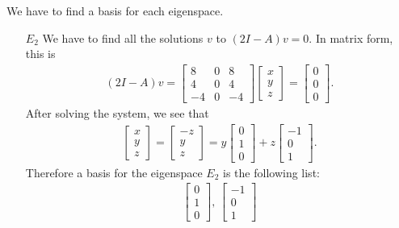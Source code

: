 \documentclass[12pt]{article}
\begin{document}
	\vspace*{16pt}
	
	We have to find a basis for each eigenspace.
	\begin{enumerate}
	\item[\underline{$E_{2}$}] We have to find all the solutions $v$ to $(2I - A)v = 0$. In matrix form, this is
		\begin{align*}
		(2 I - A) v = \begin{bmatrix}
		8 & 0 & 8 \\
		4 & 0 & 4 \\
		-4 & 0 & -4
		\end{bmatrix}
		\begin{bmatrix}
		x \\ y \\ z
		\end{bmatrix} = 
		\begin{bmatrix}
		0 \\ 0 \\ 0
		\end{bmatrix} .
		\end{align*}
	After solving the system, we see that
		\begin{align*}
		\begin{bmatrix}
		x \\ y \\ z
		\end{bmatrix} = \begin{bmatrix}
		-z \\ y \\ z
		\end{bmatrix} = y \begin{bmatrix} 0 \\ 1 \\ 0 \end{bmatrix} + z \begin{bmatrix} -1 \\ 0 \\ 1 \end{bmatrix} .
		\end{align*}
	Therefore a basis for the eigenspace $E_2$ is the following list:
		\begin{align*}
		\begin{bmatrix}
		0 \\ 1 \\ 0
		\end{bmatrix} ,\, 
		\begin{bmatrix}
		-1 \\ 0 \\ 1

\end{bmatrix}
\end{align*}
\end{enumerate}
\end{document}

